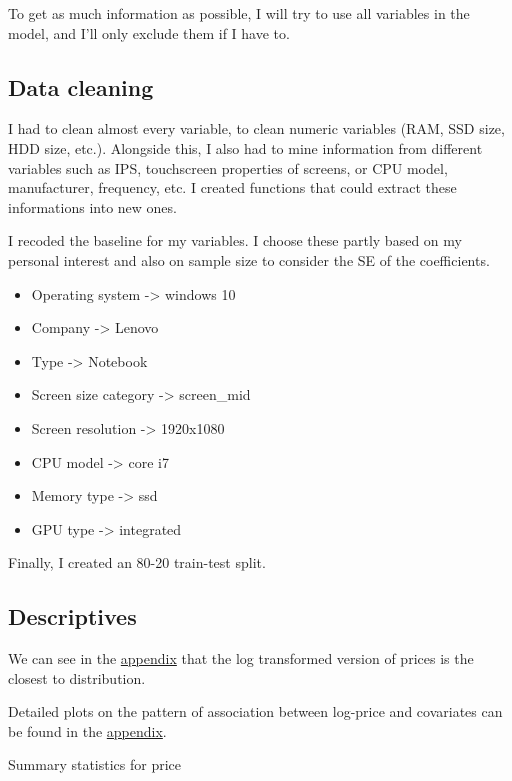 \documentclass[
]{article}
\providecommand{\tightlist}{%
  \setlength{\itemsep}{0pt}\setlength{\parskip}{0pt}}
\begin{document}
To get as much information as possible, I will try to use all variables
in the model, and I'll only exclude them if I have to.

\hypertarget{data-cleaning}{%
\subsection{Data cleaning}\label{data-cleaning}}

I had to clean almost every variable, to clean numeric variables (RAM,
SSD size, HDD size, etc.). Alongside this, I also had to mine
information from different variables such as IPS, touchscreen properties
of screens, or CPU model, manufacturer, frequency, etc. I created
functions that could extract these informations into new ones.

I recoded the baseline for my variables. I choose these partly based on
my personal interest and also on sample size to consider the SE of the
coefficients.

\begin{itemize}
\tightlist
\item
  Operating system -\textgreater{} windows 10
\item
  Company -\textgreater{} Lenovo
\item
  Type -\textgreater{} Notebook
\item
  Screen size category -\textgreater{} screen\_mid
\item
  Screen resolution -\textgreater{} 1920x1080
\item
  CPU model -\textgreater{} core i7
\item
  Memory type -\textgreater{} ssd
\item
  GPU type -\textgreater{} integrated
\end{itemize}

Finally, I created an 80-20 train-test split.

\hypertarget{descriptives}{%
\subsection{Descriptives}\label{descriptives}}

We can see in the \protect\hyperlink{appendix}{appendix} that the log
transformed version of prices is the closest to distribution.

Detailed plots on the pattern of association between log-price and
covariates can be found in the \protect\hyperlink{appendix}{appendix}.

Summary statistics for price
\end{document}
